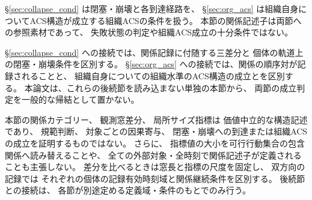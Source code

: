 \begin{remark}[閉塞・崩壊の節と組織ACSの節への接続]
\label{rem:sec6_to_sec78}
\S\ref{sec:collapse_cond} は閉塞・崩壊と各到達経路を、
\S\ref{sec:org_acs} は組織自身についてACS構造が成立する組織ACSの条件を扱う。
本節の関係記述子は両節への参照素材であって、
失敗状態の判定や組織ACS成立の十分条件ではない。

\S\ref{sec:collapse_cond} への接続では、関係記録に付随する三差分と
個体の軌道上の閉塞・崩壊条件を区別する。
\S\ref{sec:org_acs} への接続では、関係の順序対が記録されることと、
組織自身についての組織水準のACS構造の成立とを区別する。
本論文は、これらの後続節を読み込まない単独の本節から、
両節の成立判定を一般的な帰結として置かない。
\end{remark}

\begin{remark}[本節の記述方針の総括]
\label{rem:sec6_summary}
本節の関係カテゴリー、
観測窓差分、
局所サイズ指標は
価値中立的な構造記述であり、
規範判断、
対象ごとの因果寄与、
閉塞・崩壊への到達または組織ACSの成立を証明するものではない。
さらに、
指標値の大小を可行行動集合の包含関係へ読み替えることや、
全ての外部対象・全時刻で関係記述子が定義されることも主張しない。
差分を比べるときは窓長と指標の尺度を固定し、
双方向の記録では
それぞれの個体の記録有効時刻域と関係継続条件を区別する。
後続節との接続は、
各節が別途定める定義域・条件のもとでのみ行う。
\end{remark}
